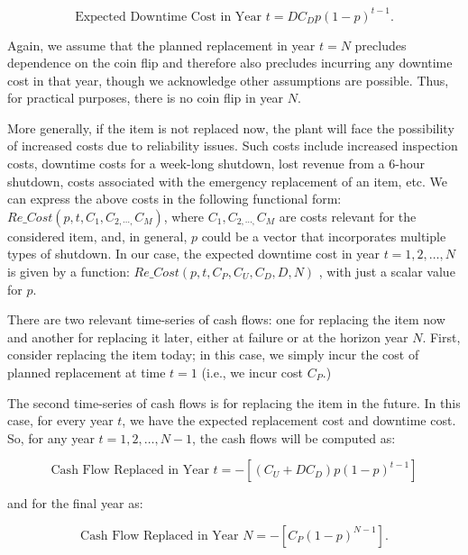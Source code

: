 \begin{equation}\label{npv_3}
\mbox{Expected Downtime Cost in Year }t=DC_{D}p \left( 1-p \right) ^{t-1}.
\end{equation}

Again, we assume that the planned replacement in year  \( t=N \)  precludes dependence
on the coin flip and therefore also precludes incurring any downtime cost in that year,
though we acknowledge other assumptions are possible. Thus, for practical purposes,
there is no coin flip in year  \( N. \)

More generally, if the item is not replaced now, the plant will face the possibility
of increased costs due to reliability issues. Such costs include increased
inspection costs, downtime costs for a week-long shutdown, lost revenue from a 6-hour
shutdown, costs associated with the emergency replacement of an item, etc. We can express
the above costs in the following functional form:
\( Re \_ Cost \left( p,t,C_{1},C_{2, \cdots , }C_{M} \right)  \),
where  \( C_{1},C_{2, \cdots, }C_{M} \)  are costs relevant for the considered item, and,
in general,  \( p \)  could be a vector that incorporates multiple types of shutdown. In
our case, the expected downtime cost in year  \( t=1, 2, \ldots ,N \)  is given by a function:
\( Re \_ Cost \left( p,t,C_{P},C_{U},C_{D},D,N \right)  \) , with just a scalar value for  \( p \).

There are two relevant time-series of cash flows: one for replacing the item now and
another for replacing it later, either at failure or at the horizon year  \( N \).
First, consider replacing the item today; in this case, we simply incur the cost of
planned replacement at time  \( t=1 \) (i.e., we incur cost  \( C_{P} \).)

The second time-series of cash flows is for replacing the item in the future.
In this case, for every year  \( t \), we have the expected replacement cost
and downtime cost. So, for any year  \( t=1, 2, \ldots ,N-1 \), the cash
flows will be computed as:\par

\begin{equation}\label{npv_4}
\mbox{Cash Flow Replaced in Year }t= - \left[  \left( C_{U}+DC_{D} \right)  p \left( 1-p \right) ^{t-1} \right]
\end{equation}


and for the final year as:\par

\begin{equation}\label{npv_5}
\mbox{Cash Flow Replaced in Year }N= - \left[ C_{P} \left( 1-p \right) ^{N-1} \right] .
\end{equation}



